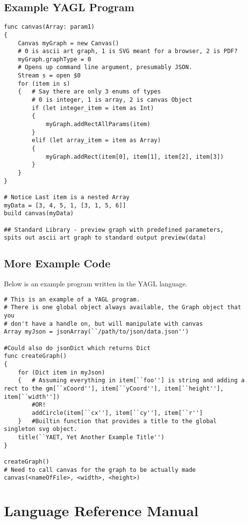 \documentclass[12pt]{article}
\begin{document}
\subsection{Example YAGL Program}
\begin{lstlisting}
func canvas(Array: param1)
{
	Canvas myGraph = new Canvas()
	# 0 is ascii art graph, 1 is SVG meant for a browser, 2 is PDF?
	myGraph.graphType = 0
	# Opens up command line argument, presumably JSON.
	Stream s = open $0
	for (item in s)
	{	# Say there are only 3 enums of types
		# 0 is integer, 1 is array, 2 is canvas Object
		if (let integer_item = item as Int)
		{
			myGraph.addRectAllParams(item)
		}
		elif (let array_item = item as Array)
		{
			myGraph.addRect(item[0], item[1], item[2], item[3])
		}
	}
}

# Notice Last item is a nested Array 
myData = [3, 4, 5, 1, [3, 1, 5, 6]]
build canvas(myData)

## Standard Library - preview graph with predefined parameters, 
spits out ascii art graph to standard output preview(data)
\end{lstlisting}

\subsection{More Example Code}
Below is an example program written in the YAGL language.

\begin{lstlisting}
# This is an example of a YAGL program. 
# There is one global object always available, the Graph object that you 
# don't have a handle on, but will manipulate with canvas
Array myJson = jsonArray(``/path/to/json/data.json'')

#Could also do jsonDict which returns Dict 
func createGraph()
{
    for (Dict item in myJson)
    {   # Assuming everything in item[``foo''] is string and adding a rect to the gm[``xCoord''], item[``yCoord''], item[``height''], item[``width''])
        #OR!
        addCircle(item[``cx''], item[``cy''], item[``r'']
    }   #Builtin function that provides a title to the global singleton svg object. 
    title(``YAET, Yet Another Example Title'')
}

createGraph()
# Need to call canvas for the graph to be actually made
canvas(<nameOfFile>, <width>, <height>)

\end{lstlisting}

\section{Language Reference Manual}
\end{document}
